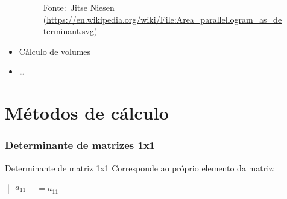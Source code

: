 \documentclass[pdftex, brazil, aspectratio=169]{beamer}
\begin{document}
\begin{frame}[t]
\begin{itemize}
{\begin{figure}[H]
\begin{center}
          \footnotesize{Fonte:~Jitse Niesen\\ \tiny{(\url{https://en.wikipedia.org/wiki/File:Area\_parallellogram\_as\_determinant.svg})}}
        \end{center}
      \end{figure}}
    \item Cálculo de volumes
    \item \ldots
  \end{itemize}
\end{frame}

\section{Métodos de cálculo}

\begin{frame}[t]
  \frametitle{Determinante de matrizes 1x1}
  \begin{block}{Determinante de matriz 1x1}
    Corresponde ao próprio elemento da matriz:
    \begin{center}
    $\begin{vmatrix}
      a_{11}\end{vmatrix} = a_{11}$
    \end{center}
  \end{block}
\end{frame}
\end{document}
